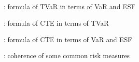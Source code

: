\subsection*{}
\item {}: formula of TVaR in terms of VaR and ESF
\item {}: formula of CTE in terms of TVaR
\item {}: formula of CTE in terms of VaR and ESF
\item {}: coherence of some common risk measures

